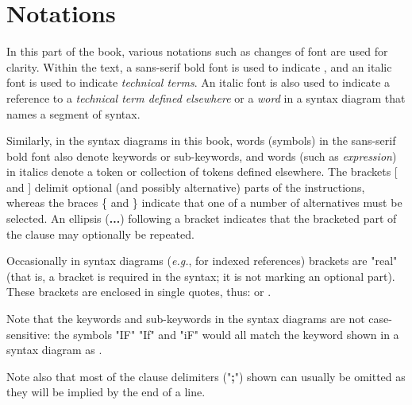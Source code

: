 \chapter{Notations}\label{refnotat}
 
In this part of the
book,
various notations such as changes of font are used for clarity.
Within the text, a
sans-serif bold font is used to indicate , and an italic
font is used to indicate \emph{technical terms}.
An italic font is also used to indicate a reference to a
\emph{technical term defined elsewhere} or a \emph{word} in a
syntax diagram that names a segment of syntax.
 
Similarly, in the syntax diagrams in this
book,
words (symbols) in the
sans-serif
bold font also denote keywords or
sub-keywords, and words (such as \emph{expression}) in italics
denote a token or collection of tokens defined elsewhere.
The brackets [ and ] delimit optional (and possibly
alternative) parts of the instructions, whereas the braces \{
and \} indicate that one of a number of alternatives must be
selected.
An ellipsis (\textbf{...}) following a bracket indicates that
the bracketed part of the clause may optionally be repeated.
 
Occasionally in syntax diagrams (\emph{e.g.}, for indexed references)
brackets are "real" (that is, a bracket is required in the
syntax; it is not marking an optional part).
These brackets are enclosed in single quotes, thus:
\keyword{'['} or \keyword{']'}.
 
Note that the keywords and sub-keywords in the syntax diagrams are not
case-sensitive: the symbols "IF" "If" and "iF" would
all match the keyword shown in a syntax diagram as .
 
Note also that most of the clause delimiters ("\textbf{;}") shown
can usually be omitted as they will be implied by the end of a line.
